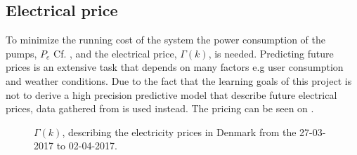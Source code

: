 \subsection{Electrical price}\label{sec:cost_fkt} %
%
%
To minimize the running cost of the system the power consumption of the pumps, $P_e$ Cf. , and the electrical price, $\Gamma(k)$, is needed. Predicting future prices is an extensive task that depends on many factors e.g user consumption and weather conditions. Due to the fact that the learning goals of this project is not to derive a high precision predictive model that describe future electrical prices, data gathered from \cite{Electrical_price} is used instead. The pricing can be seen on . 





	


\begin{figure}[H]
\centering

\caption{$\Gamma(k)$, describing the electricity prices in Denmark from the 27-03-2017 to 02-04-2017.}
\label{fig:electrical_price} 
\end{figure}

